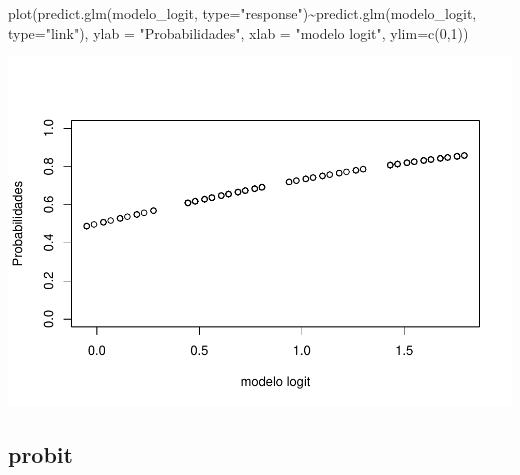 \documentclass[
]{article}
\newenvironment{Shaded}{\begin{snugshade}}{\end{snugshade}}
\newcommand{\AttributeTok}[1]{\textcolor[rgb]{0.80,0.80,0.80}{#1}}
\newcommand{\DecValTok}[1]{\textcolor[rgb]{0.86,0.86,0.80}{#1}}
\newcommand{\FunctionTok}[1]{\textcolor[rgb]{0.94,0.94,0.56}{#1}}
\newcommand{\NormalTok}[1]{\textcolor[rgb]{0.80,0.80,0.80}{#1}}
\newcommand{\OtherTok}[1]{\textcolor[rgb]{0.94,0.94,0.56}{#1}}
\newcommand{\SpecialCharTok}[1]{\textcolor[rgb]{0.86,0.64,0.64}{#1}}
\newcommand{\StringTok}[1]{\textcolor[rgb]{0.80,0.58,0.58}{#1}}
\begin{document}
\begin{Shaded}
\begin{Highlighting}[]
\FunctionTok{plot}\NormalTok{(}\FunctionTok{predict.glm}\NormalTok{(modelo\_logit, }\AttributeTok{type=}\StringTok{"response"}\NormalTok{)}\SpecialCharTok{\textasciitilde{}}\FunctionTok{predict.glm}\NormalTok{(modelo\_logit, }\AttributeTok{type=}\StringTok{"link"}\NormalTok{),}
     \AttributeTok{ylab =} \StringTok{"Probabilidades"}\NormalTok{,}
     \AttributeTok{xlab =}  \StringTok{"modelo logit"}\NormalTok{,}
     \AttributeTok{ylim=}\FunctionTok{c}\NormalTok{(}\DecValTok{0}\NormalTok{,}\DecValTok{1}\NormalTok{))}
\end{Highlighting}
\end{Shaded}

\includegraphics{EDA__files/figure-latex/unnamed-chunk-10-2.pdf}

\hypertarget{probit}{%
\subsection{probit}\label{probit}}

\begin{Shaded}
\end{Shaded}
\end{document}
